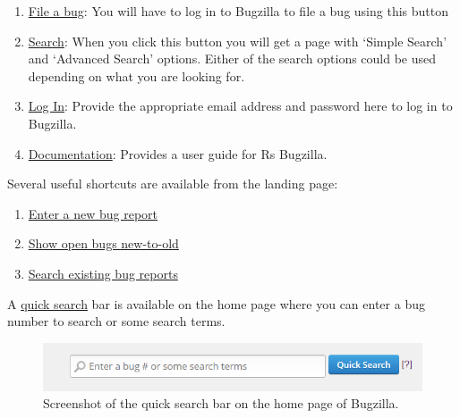 \documentclass[
]{book}
\begin{document}
\begin{enumerate}
\def\labelenumi{\arabic{enumi}.}
\item
  \href{https://bugs.r-project.org/enter_bug.cgi}{File a bug}: You will have to log in to Bugzilla to file a bug using this button
\item
  \href{https://bugs.r-project.org/query.cgi}{Search}: When you click this button you will get a page with `Simple Search' and `Advanced Search' options. Either of the search options could be used depending on what you are looking for.
\item
  \href{https://bugs.r-project.org/?GoAheadAndLogIn=1}{Log In}: Provide the appropriate email address and password here to log in to Bugzilla.
\item
  \href{https://bugzilla.readthedocs.io/en/latest/using/index.html}{Documentation}: Provides a user guide for R\textquotesingle s Bugzilla.
\end{enumerate}

Several useful shortcuts are available from the landing page:

\begin{enumerate}
\def\labelenumi{\arabic{enumi}.}
\item
  \href{https://bugs.r-project.org/enter_bug.cgi}{Enter a new bug report}
\item
  \href{https://bugs.r-project.org/buglist.cgi?bug_file_loc_type=allwordssubstr\&bug_status=NEW\&bug_status=ASSIGNED\&bug_status=CONFIRMED\&bug_status=REOPENED\&bug_status=UNCONFIRMED\&bugidtype=include\&chfieldto=Now\&cmdtype=doit\&emailassigned_to1=1\&emailassigned_to2=1\&emailcc2=1\&emailreporter2=1\&emailtype1=substring\&emailtype2=substring\&field0-0-0=noop\&long_desc_type=substring\&order=bugs.delta_ts\%20desc\&query_format=advanced\&short_desc_type=allwordssubstr\&type0-0-0=noop}{Show open bugs new-to-old}
\item
  \href{https://bugs.r-project.org/query.cgi}{Search existing bug reports}
\end{enumerate}

A \href{https://bugs.r-project.org/page.cgi?id=quicksearch.html}{quick search} bar is available on the home page where you can enter a bug number to search or some search terms.

\begin{figure}
\centering
\includegraphics{img/quicksearch.png}
\caption{Screenshot of the quick search bar on the home page of Bugzilla.}
\end{figure}
\end{document}
